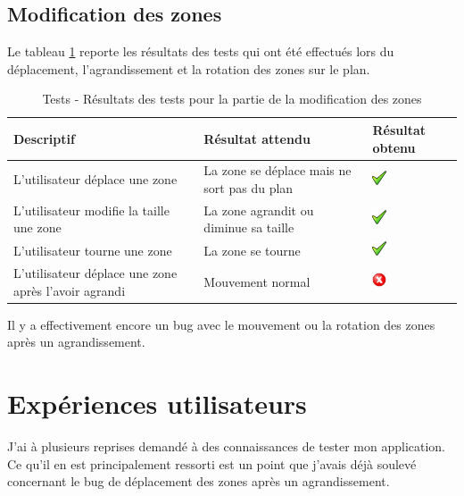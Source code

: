 \subsection{Modification des zones} %
\label{sub:logout}
Le tableau \ref{tab:testAffichageZones} reporte les résultats des tests qui ont été effectués lors du déplacement, l'agrandissement et la rotation des zones sur le plan.
\begin{table}[H]
\begin{tabularx}{\textwidth}{|X|X|m{1.5cm}|}
  \hline
  \bf{Descriptif} & \bf{Résultat attendu} & \bf{Résultat obtenu} \\
  \hline
  L'utilisateur déplace une zone  & La zone se déplace mais ne sort pas du plan & \includegraphics[width=16px]{00_media/ok.png} \\
  \hline
  L'utilisateur modifie la taille une zone  & La zone agrandit ou diminue sa taille  & \includegraphics[width=16px]{00_media/ok.png} \\
  \hline
  L'utilisateur tourne une zone  & La zone se tourne  & \includegraphics[width=16px]{00_media/ok.png} \\
  \hline
  L'utilisateur déplace une zone après l'avoir agrandi & Mouvement normal & \includegraphics[width=16px]{00_media/not_ok.png} \\
  \hline
\end{tabularx}
\caption{Tests - Résultats des tests pour la partie de la modification des zones}
\label{tab:testAffichageZones}
\end{table}
Il y a effectivement encore un bug avec le mouvement ou la rotation des zones après un agrandissement. 

\section{Expériences utilisateurs} %
\label{sec:exp_riences_utilisateurs}
J'ai à plusieurs reprises demandé à des connaissances de tester mon application. Ce qu'il en est principalement ressorti est un point que j'avais déjà soulevé concernant le bug de déplacement des zones après un agrandissement.

